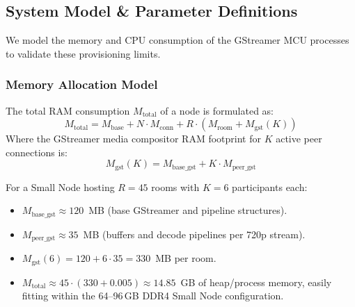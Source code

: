 \documentclass{article}
\begin{document}
\begin{table}[htbp]
\centering
\caption{Total Cluster Capacity and Resource Summary}
\label{tab:cluster_capacity}
\noindent{}
\end{table}

\subsection{System Model \& Parameter Definitions}

We model the memory and CPU consumption of the GStreamer MCU processes to validate these provisioning limits.

\subsubsection{Memory Allocation Model}
The total RAM consumption $M_{\text{total}}$ of a node is formulated as:
\begin{equation}
M_{\text{total}} = M_{\text{base}} + N \cdot M_{\text{conn}} + R \cdot (M_{\text{room}} + M_{\text{gst}}(K))
\end{equation}
Where the GStreamer media compositor RAM footprint for $K$ active peer connections is:
\begin{equation}
M_{\text{gst}}(K) = M_{\text{base\_gst}} + K \cdot M_{\text{peer\_gst}}
\end{equation}

For a Small Node hosting $R = 45$ rooms with $K = 6$ participants each:
\begin{itemize}
    \item $M_{\text{base\_gst}} \approx 120$~MB (base GStreamer and pipeline structures).
    \item $M_{\text{peer\_gst}} \approx 35$~MB (buffers and decode pipelines per 720p stream).
    \item $M_{\text{gst}}(6) = 120 + 6 \cdot 35 = 330$~MB per room.
    \item $M_{\text{total}} \approx 45 \cdot (330 + 0.005) \approx 14.85$~GB of heap/process memory,
          easily fitting within the 64--96\,GB DDR4 Small Node configuration.
\end{itemize}
\end{document}
